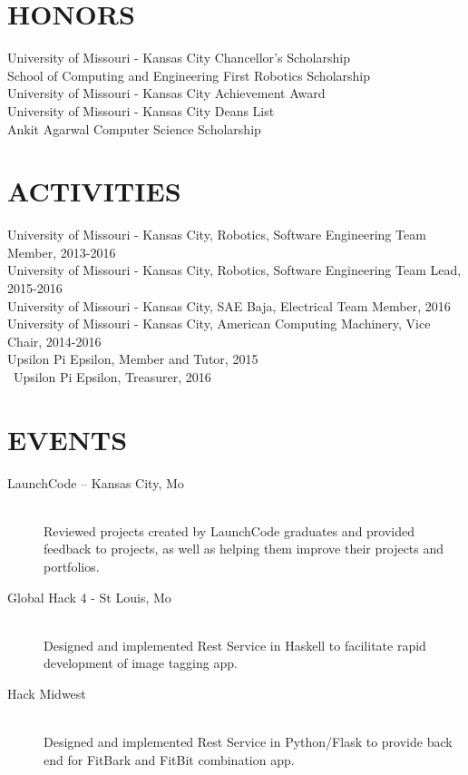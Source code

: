 \documentclass[margin,10pt]{res} %
\begin{document}
\begin{resume}
\section{HONORS}
University of Missouri - Kansas City Chancellor's Scholarship \\
School of Computing and Engineering First Robotics Scholarship \\ 
University of Missouri - Kansas City Achievement Award  \\
University of Missouri - Kansas City Deans List \\
Ankit Agarwal Computer Science Scholarship

 
\section{ACTIVITIES}
University of Missouri - Kansas City, Robotics, Software Engineering Team Member, 2013-2016 \\
University of Missouri - Kansas City, Robotics, Software Engineering Team Lead, 2015-2016 \\
University of Missouri - Kansas City, SAE Baja, Electrical Team Member, 2016 \\
University of Missouri - Kansas City, American Computing Machinery, Vice Chair, 2014-2016\\
Upsilon Pi Epsilon, Member and Tutor, 2015 \\\
Upsilon Pi Epsilon, Treasurer, 2016
 

\section{EVENTS}
\begin{description}
\item [LaunchCode -- Kansas City, Mo] \hfill \\
    Reviewed projects created by LaunchCode graduates and provided feedback to projects, as well as helping them improve their projects and portfolios.

\item [Global Hack 4 - St Louis, Mo] \hfill \\
   Designed and implemented Rest Service in Haskell to facilitate rapid development of image tagging app.

\item [Hack Midwest] \hfill \\
  Designed and implemented Rest Service in Python/Flask to provide back end for FitBark and FitBit combination app.
\end{description}
\end{resume} 
\end{document}
